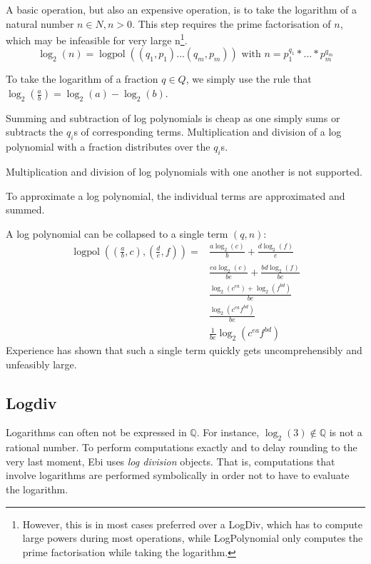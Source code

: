 \documentclass{book}
\DeclareMathOperator{\logpol}{logpol}
\begin{document}
            A basic operation, but also an expensive operation, is to take the logarithm of a natural number $n \in N, n > 0$.
            This step requires the prime factorisation of $n$, which may be infeasible for very large n\footnote{However, this is in most cases preferred over a LogDiv, which has to compute large powers during most operations, while LogPolynomial only computes the prime factorisation while taking the logarithm.}.
            $$ \log_2(n) = \logpol((q_1, p_1) \ldots (q_m, p_m)) \text{ with } n = p_1^{q_1} * \ldots * p_m^{q_m}$$
            
            To take the logarithm of a fraction $q \in Q$, we simply use the rule that $\log_2(\frac{a}{b}) = \log_2(a) - \log_2(b)$.

            Summing and subtraction of log polynomials is cheap as one simply sums or subtracts the $q_i$s of corresponding terms.
            Multiplication and division of a log polynomial with a fraction distributes over the $q_i$s.

            Multiplication and division of log polynomials with one another is not supported.

            To approximate a log polynomial, the individual terms are approximated and summed.

            A log polynomial can be collapsed to a single term $(q, n)$:
            \begin{align*}
                \logpol((\frac{a}{b}, c), (\frac{d}{e}, f)) =& \frac{a \log_2(c)}{b} + \frac{d \log_2(f)}{e}\\
                & \frac{ea \log_2(c)}{be} + \frac{bd \log_2(f)}{be}\\
                & \frac{\log_2(c^{ea}) + \log_2(f^{bd})}{be}\\
                & \frac{\log_2(c^{ea} f^{bd})}{be}\\
                & \frac{1}{be} \log_2(c^{ea} f^{bd})
            \end{align*}
            Experience has shown that such a single term quickly gets uncomprehensibly and unfeasibly large.

        \subsection{Logdiv}
            Logarithms can often not be expressed in $\mathbb{Q}$.
            For instance, $\log_2(3) \notin \mathbb{Q}$ is not a rational number.
            To perform computations exactly and to delay rounding to the very last moment, Ebi uses \emph{log division} objects.
            That is, computations that involve logarithms are performed symbolically in order not to have to evaluate the logarithm.
            
\end{document}

